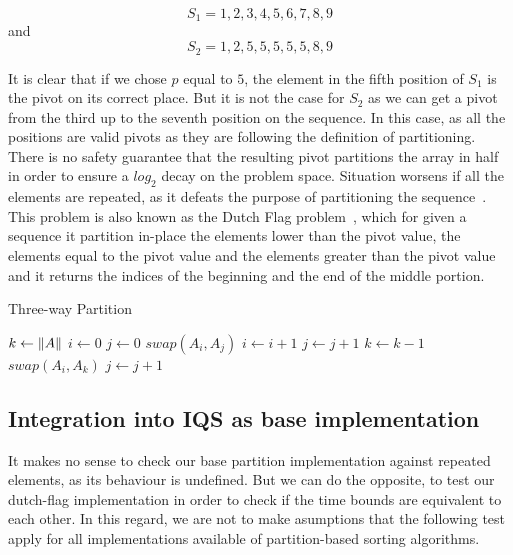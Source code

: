 $$ S_1={1,2,3,4,5,6,7,8,9} $$
and
$$S_2={1,2,5,5,5,5,5,8,9}$$

It is clear that if we chose $p$ equal to $5$, the element in the fifth position of $S_1$ is the pivot on its correct place. But it is not the case for $S_2$ as we can get a pivot from the third up to the seventh position on the sequence. In this case, as all the positions are valid pivots as they are following the definition of partitioning. There is no safety guarantee that the resulting pivot  partitions the array in half in order to ensure a $log_2$ decay on the problem space. Situation worsens if all the elements are repeated, as it defeats the purpose of partitioning the sequence~\cite{7416566}.\\

This problem is also known as the Dutch Flag problem~\cite{10.5555/550359}, which for given a sequence it partition in-place the elements lower than the pivot value, the elements equal to the pivot value and the elements greater than the pivot value and it returns the indices of the beginning and the end of the middle portion.\\

\begin{algorithm}
\caption{Three-way Partition}\label{ALG:DUTCH_FLAG_PARTITION}
\begin{algorithmic}[1]
    \State $k \gets \lVert A\rVert$
    \State $i \gets 0$
    \State $j \gets 0$
            \State $swap(A_i, A_j)$
            \State $i \gets i+1$
            \State $j \gets j+1$
            \State $k \gets k-1$
            \State $swap(A_i, A_k)$
        \Else
            \State $j \gets j+1$
        \EndIf
    \EndWhile
    \EndProcedure
\end{algorithmic}
\end{algorithm}

\subsection{Integration into IQS as base implementation}

It makes no sense to check our base partition implementation against repeated elements, as its behaviour is undefined. But we can do the opposite, to test our dutch-flag implementation in order to check if the time bounds are equivalent to each other. In this regard, we are not to make asumptions that the following test apply for all implementations available of partition-based sorting algorithms.\\


